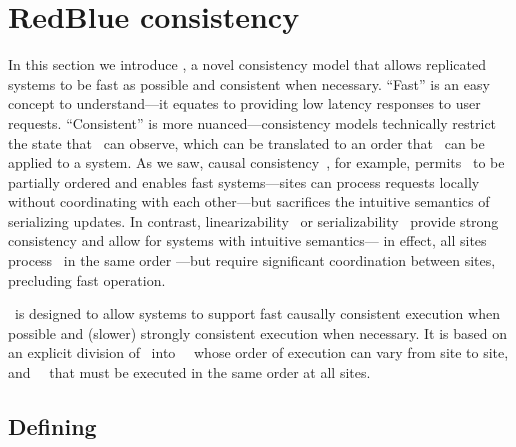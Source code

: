 \section{RedBlue consistency}
\label{ch:redblue:sect:redblue}

In this section we introduce \RBc, a novel consistency model that
allows replicated systems to be fast as possible and consistent when
necessary. ``Fast'' is an easy concept to understand---it equates to
providing low latency responses to user requests.  ``Consistent'' is 
more nuanced---consistency models technically restrict the 
state that \operations\ can observe, which
can be translated to an order that \operations\ can be applied
 to a system.
As we saw, causal consistency~\cite{Lloyd2011Causal,
Terry1995Managing,Mahajan2010Depot,Feldman2010Sporc}, for example, 
permits \operations\ to be partially ordered and enables
fast systems---sites can process requests locally without
coordinating with each other---but sacrifices the intuitive semantics
of serializing updates. In contrast, 
linearizability~\cite{Herlihy1990Linearizability} or
serializability~\cite{Bernstein1987CCR} provide strong consistency 
and allow for systems with intuitive
  semantics--- in effect, all sites process 
\operations\
in the same order ---but
  require significant coordination between sites,
  precluding fast operation.

\Rbc\ is designed to allow systems to support fast
  causally consistent execution when possible and (slower) strongly
  consistent 
execution when necessary. It is based on an explicit division of
\operations\ into \blue\ \operations\ whose order of execution
can vary from site to site, and \red\ \operations\ that must
be executed in the same order at all sites.



\subsection{Defining \RBc}

